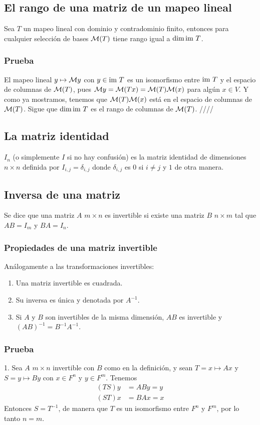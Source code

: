 \documentclass{article}
\begin{document}
\subsection{El rango de una matriz de un mapeo lineal}
Sea $T$ un mapeo lineal con dominio y contradominio finito,
entonces para cualquier selección de bases $\mathcal{M}(T)$ tiene rango
igual a $\dim\text{im } T$.
\subsubsection*{Prueba}
El mapeo lineal $y \mapsto \mathcal{M} y$ con $y\in\text{im } T$ es un isomorfismo
entre $\text{im } T$ y el espacio de columnas de $\mathcal{M}(T)$, pues
$\mathcal{M} y=\mathcal{M}(Tx) = \mathcal{M}(T)\mathcal{M}(x)$ para algún $x\in V$. Y como ya mostramos,
tenemos que $\mathcal{M}(T)\mathcal{M}(x)$ está en el espacio de columnas de $\mathcal{M}(T)$.
Sigue que $\dim\text{im } T$ es el rango de columnas de $\mathcal{M}(T)$.
\hfill ////

\subsection{La matriz identidad}
$I_n$ (o simplemente $I$ si no hay confusión) es la matriz identidad
de dimensiones $n\times n$ definida por $I_{i,j}=\delta_{i,j}$
donde $\delta_{i,j}$ es $0$ si $i\neq j$ y $1$ de otra manera.

\subsection{Inversa de una matriz}
Se dice que una matriz $A$ $m\times n$ es invertible si
existe una matriz $B$ $n\times m$ tal que $AB=I_m$ y
$BA=I_n$.

\subsubsection{Propiedades de una matriz invertible}
Análogamente a las transformaciones invertibles:
\begin{enumerate}
    \item Una matriz invertible es cuadrada.
    \item Su inversa es única y denotada por $A^{-1}$.
    \item Si $A$ y $B$ son invertibles de la misma dimensión,
    $AB$ es invertible y $(AB)^{-1}=B^{-1}A^{-1}$.
\end{enumerate}
\subsubsection*{Prueba}
1. Sea $A$ $m\times n$ invertible con $B$ como en la definición, y sean
$T= x\mapsto Ax$ y $S= y\mapsto By$ con $x\in F^n$ y $y\in F^m$.
Tenemos
\begin{align*}
    (TS)y &= ABy = y\\
    (ST)x &= BAx = x
\end{align*}
Entonces $S=T^{-1}$, de manera que $T$ es un isomorfismo entre
$F^n$ y $F^m$, por lo tanto $n=m$.
\end{document}

